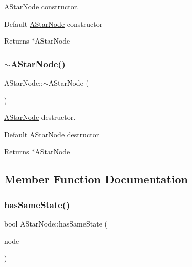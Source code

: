 \mbox{\hyperlink{struct_a_star_node}{A\+Star\+Node}} constructor. 

Default \mbox{\hyperlink{struct_a_star_node}{A\+Star\+Node}} constructor

\begin{DoxyReturn}{Returns}
$\ast$\+A\+Star\+Node 
\end{DoxyReturn}
\mbox{\label{struct_a_star_node_a5d0ea0d3912a227675c5bc9d1deb2ca6}} 
\subsubsection{\texorpdfstring{$\sim$\+A\+Star\+Node()}{~AStarNode()}}
{\footnotesize\ttfamily A\+Star\+Node\+::$\sim$\+A\+Star\+Node (\begin{DoxyParamCaption}{ }\end{DoxyParamCaption})}



\mbox{\hyperlink{struct_a_star_node}{A\+Star\+Node}} destructor. 

Default \mbox{\hyperlink{struct_a_star_node}{A\+Star\+Node}} destructor

\begin{DoxyReturn}{Returns}
$\ast$\+A\+Star\+Node 
\end{DoxyReturn}


\subsection{Member Function Documentation}
\mbox{\label{struct_a_star_node_a25645a980664aa05e56e4f06e433d9d3}} 
\subsubsection{\texorpdfstring{has\+Same\+State()}{hasSameState()}}
{\footnotesize\ttfamily bool A\+Star\+Node\+::has\+Same\+State (\begin{DoxyParamCaption}\item[{const \mbox{\hyperlink{struct_a_star_node}{A\+Star\+Node}} \&}]{node }\end{DoxyParamCaption})}



